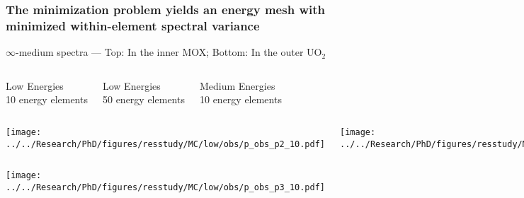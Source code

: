 \documentclass[compress,10pt]{beamer}
\begin{document}
\begin{frame}
    \frametitle{The minimization problem yields an energy mesh with minimized within-element spectral variance}

    \centering

    \vspace{-4mm}
    {\small $\infty$-medium spectra --- Top: In the inner MOX; Bottom: In the outer UO$_2$ } \\

    \begin{columns}[t]

        \centering

        {\footnotesize Low Energies\\ 10 energy elements}

        \centering

        {\footnotesize Low Energies\\ 50 energy elements}

        \centering

        {\footnotesize Medium Energies\\ 10 energy elements}

    \end{columns}

    \begin{columns}[t]

        \centering

        {}\texttt{[image: ../../Research/PhD/figures/resstudy/MC/low/obs/p\_obs\_p2\_10.pdf]}

        \centering

        {}\texttt{[image: ../../Research/PhD/figures/resstudy/MC/low/obs/p\_obs\_p2\_50.pdf]}

        \centering

       {}\texttt{[image: ../../Research/PhD/figures/resstudy/MC/med/obs/p\_obs\_p2\_10.pdf]}

    \end{columns}

     \begin{columns}[t]

        \centering

        {}\texttt{[image: ../../Research/PhD/figures/resstudy/MC/low/obs/p\_obs\_p3\_10.pdf]}


\end{columns}
\end{frame}
\end{document}
